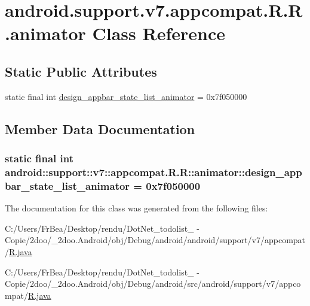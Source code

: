 \hypertarget{classandroid_1_1support_1_1v7_1_1appcompat_1_1_r_1_1animator}{
\section{android.support.v7.appcompat.R.R.animator Class Reference}
\label{classandroid_1_1support_1_1v7_1_1appcompat_1_1_r_1_1animator}
}
\subsection*{Static Public Attributes}
\begin{CompactItemize}
\item 
static final int \hyperlink{classandroid_1_1support_1_1v7_1_1appcompat_1_1_r_1_1animator_87d2c7cc5851a8b0f507741d3140c9a2}{design\_\-appbar\_\-state\_\-list\_\-animator} = 0x7f050000
\end{CompactItemize}


\subsection{Member Data Documentation}
\hypertarget{classandroid_1_1support_1_1v7_1_1appcompat_1_1_r_1_1animator_87d2c7cc5851a8b0f507741d3140c9a2}{
\subsubsection[{design\_\-appbar\_\-state\_\-list\_\-animator}]{\setlength{\rightskip}{0pt plus 5cm}static final int android::support::v7::appcompat.R.R::animator::design\_\-appbar\_\-state\_\-list\_\-animator = 0x7f050000}}
\label{classandroid_1_1support_1_1v7_1_1appcompat_1_1_r_1_1animator_87d2c7cc5851a8b0f507741d3140c9a2}




The documentation for this class was generated from the following files:\begin{CompactItemize}
\item 
C:/Users/FrBea/Desktop/rendu/DotNet\_\-todolist\_ - Copie/2doo/\_\-2doo.Android/obj/Debug/android/android/support/v7/appcompat/\hyperlink{android_2support_2v7_2appcompat_2_r_8java}{R.java}\item 
C:/Users/FrBea/Desktop/rendu/DotNet\_\-todolist\_ - Copie/2doo/\_\-2doo.Android/obj/Debug/android/src/android/support/v7/appcompat/\hyperlink{src_2android_2support_2v7_2appcompat_2_r_8java}{R.java}\end{CompactItemize}
